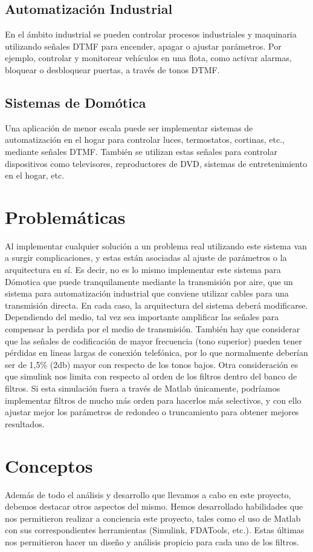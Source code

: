 \subsection*{Automatización Industrial}
En el ámbito industrial se pueden controlar procesos industriales y maquinaria utilizando señales DTMF para encender, apagar o ajustar parámetros. Por ejemplo, controlar y monitorear vehículos en una flota, como activar alarmas, bloquear o desbloquear puertas, a través de tonos DTMF.

\subsection*{Sistemas de Domótica}
Una aplicación de menor escala puede ser implementar sistemas de automatización en el hogar para controlar luces, termostatos, cortinas, etc., mediante señales DTMF. También se utilizan estas señales para controlar dispositivos como televisores, reproductores de DVD, sistemas de entretenimiento en el hogar, etc.

\section{Problemáticas}
Al implementar cualquier solución a un problema real utilizando este sistema van a surgir complicaciones, y estas están asociadas al ajuste de parámetros o la arquitectura en sí. Es decir, no es lo mismo implementar este sistema para Dómotica que puede tranquilamente mediante la transmisión por aire, que un sistema para automatización industrial que conviene utilizar cables para una transmisión directa. En cada caso, la arquitectura del sistema deberá modificarse. Dependiendo del medio, tal vez sea importante amplificar las señales para compensar la perdida por el medio de transmisión. También hay que considerar que las señales de codificación de mayor frecuencia (tono superior) pueden tener pérdidas en lineas largas de conexión telefónica, por lo que normalmente deberían ser de 1,5\% (2db) mayor con respecto de los tonos bajos.
Otra consideración es que simulink nos limita con respecto al orden de los filtros dentro del banco de filtros. Si esta simulación fuera a través de Matlab únicamente, podríamos implementar filtros de mucho más orden para hacerlos más selectivos, y con ello ajustar mejor los parámetros de redondeo o truncamiento para obtener mejores resultados.

\section{Conceptos}
Además de todo el análisis y desarrollo que llevamos a cabo en este proyecto, debemos destacar otros aspectos del mismo. Hemos desarrollado habilidades que nos permitieron realizar a conciencia este proyecto, tales como el uso de Matlab con sus correspondientes herramientas (Simulink, FDATools, etc.). Estas últimas nos permitieron hacer un diseño y análisis propicio para cada uno de los filtros.

